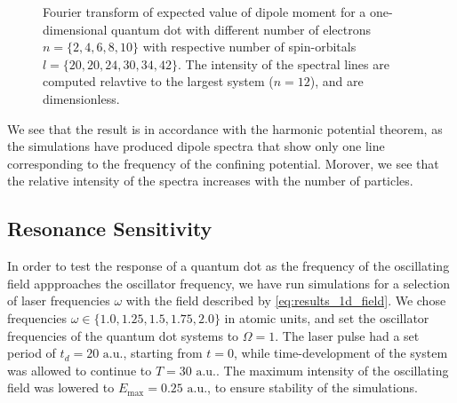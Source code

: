 \begin{figure}
    \centering
    \caption{Fourier transform of expected value of dipole moment for 
        a one-dimensional quantum dot with different number of electrons
        $n=\{2,4,6,8,10\}$ with respective number of spin-orbitals 
        $l=\{20,20,24,30,34,42\}$. The intensity of the spectral lines 
        are computed relavtive to the largest system ($n=12$), and are 
        dimensionless.
    }
    \label{fig:1d_dipole_spectra}
\end{figure}

We see that the result is in accordance with the harmonic potential theorem, as the 
simulations have produced dipole spectra that show only one line corresponding to the 
frequency of the confining potential. Morover, we see that the relative intensity of 
the spectra increases with the number of particles.

\subsection{Resonance Sensitivity}

In order to test the response of a quantum dot as the frequency of the oscillating 
field appproaches the oscillator frequency, we have run simulations for a selection 
of laser frequencies $\omega$ with the field described by \autoref{eq:results_1d_field}.
We chose frequencies $\omega\in\{1.0, 1.25, 1.5, 1.75, 2.0\}$ in atomic units, and set the 
oscillator frequencies of the quantum dot systems to $\Omega=1$. The laser pulse 
had a set period of $t_d=20 \text{ a.u.}$, starting from $t=0$, while time-development 
of the system was allowed to continue to $T=30 \text{ a.u.}$. The maximum intensity 
of the oscillating field was lowered to $E_\text{max} = 0.25 \text{ a.u.}$,
to ensure stability of the simulations. 

